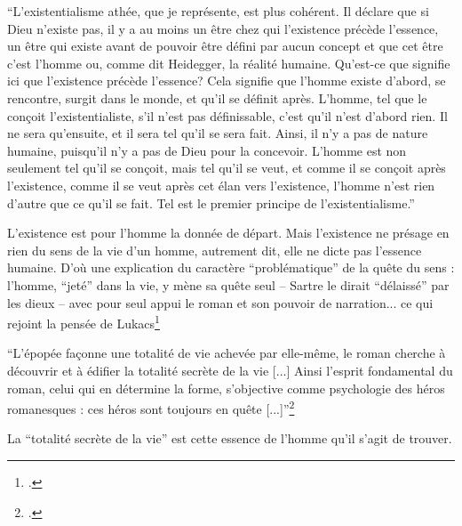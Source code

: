 \documentclass[a4paper,10pt]{article}
\begin{document}
				\begin{center}
					\footnotesize
					\begin{minipage}{0.7\textwidth}
						``L'existentialisme athée, que je représente, est plus cohérent. Il déclare que si Dieu n'existe pas, il y a au moins un être chez qui
						l'existence précède l'essence, un être qui existe avant de pouvoir être défini par aucun concept et que cet être c'est l'homme ou, comme
						dit Heidegger, la réalité humaine. Qu'est-ce que signifie ici que l'existence précède l'essence? Cela signifie que l'homme existe
						d'abord, se rencontre, surgit dans le monde, et qu'il se définit après. L'homme, tel que le conçoit l'existentialiste, s'il n'est pas
						définissable, c'est qu'il n'est d'abord rien. Il ne sera qu'ensuite, et il sera tel qu'il se sera fait. Ainsi, il n'y a pas de nature humaine,
						puisqu'il n'y a pas de Dieu pour la concevoir. L'homme est non seulement tel qu'il se conçoit, mais tel qu'il se veut, et comme il se
						conçoit après l'existence, comme il se veut après cet élan vers l'existence, l'homme n'est rien d'autre que ce qu'il se fait. Tel est le
						premier principe de l'existentialisme.''
					\end{minipage}
				\end{center}
				L'existence est pour l'homme la donnée de départ. Mais l'existence ne présage en rien du sens de la vie d'un homme, autrement dit, elle ne dicte pas l'essence humaine. D'où une explication du caractère ``problématique'' de la quête du sens : l'homme, ``jeté'' dans la vie, y mène sa quête seul -- Sartre le dirait ``délaissé'' par les dieux -- avec pour seul appui le roman et son pouvoir de narration...
				ce qui rejoint la pensée de Lukacs\footcite{Lukacs1916}
				\begin{center}
					\footnotesize
					\begin{minipage}{0.7\textwidth}
						``L'épopée façonne une totalité de vie achevée par elle-même, le roman cherche à découvrir et à édifier la totalité secrète de la vie [...] Ainsi l'esprit fondamental du roman, celui qui en détermine la forme, s'objective comme psychologie des héros romanesques : ces héros sont toujours en quête [...]''\footcite[p.~54]{Lukacs1916}
					\end{minipage}
				\end{center}
				La ``totalité secrète de la vie'' est cette essence de l'homme qu'il s'agit de trouver.
\end{document}
